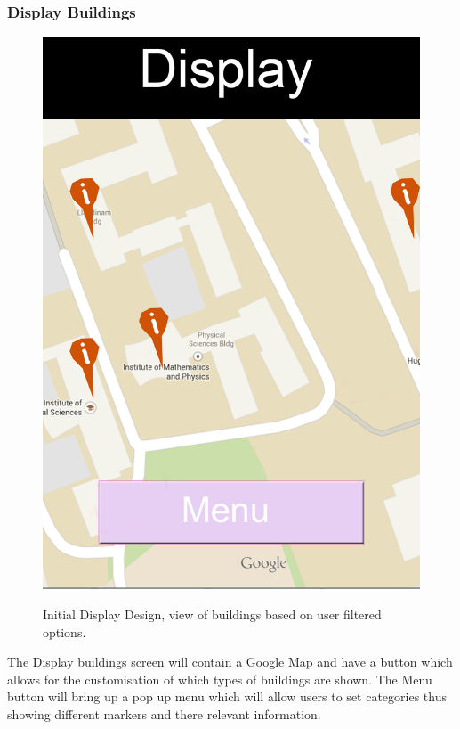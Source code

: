 \subsubsection{Display Buildings}
\begin{figure}[h]
\includegraphics[scale=0.6]{Design/Display.png}\\
\caption[Initial Display Design]{Initial Display Design, view of buildings based on user filtered options.}
\end{figure}
The Display buildings screen will contain a Google Map and have a button which allows for the customisation of which types of buildings are shown. The Menu button will bring up a pop up menu which will allow users to set categories thus showing different markers and there relevant information. 
\newpage

